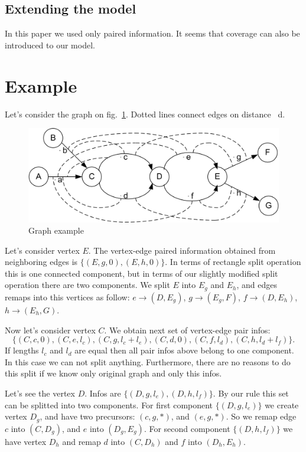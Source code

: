 \documentclass[12pt,a4paper,oneside]{article}
\begin{document}
\subsection{Extending the model}
  In this paper we used only paired information. It seems that coverage can also be introduced to our model.
\section{Example}
Let's consider the graph on fig.~\ref{fig1}. Dotted lines connect edges on
distance ~d.
\begin{figure}
\begin{center}\includegraphics{jpg/Paired_Example.jpg}\end{center}
\caption{Graph example}
\label{fig1}
\end{figure}
Let's consider vertex $E$. The vertex-edge paired information obtained
from neighboring edges is $\{(E,g, 0),(E,h,0)\}$. In terms of rectangle
split operation this is one connected component, but in terms of our
slightly modified split operation there are two components. We split $E$
into $E_g$ and $E_h$, and edges remaps into this vertices as follow:
$e \rightarrow (D, E_g)$, $g \rightarrow (E_g,F)$, $f \rightarrow (D,E_h)$, $h \rightarrow (E_h, G)$.

Now let's consider vertex $C$. We obtain next set of vertex-edge pair
infos: $$\{(C,c,0), (C,e,l_c), (C,g,l_c+l_e), (C,d,0), (C,f,l_d),
(C,h,l_d+l_f)\}.$$ If lengths $l_c$ and $l_d$ are equal then all pair infos
above belong to one component. In this case we can not split anything.
Furthermore, there are no reasons to do this split if we know only
original graph and only this infos.

Let's see the vertex $D$. Infos are $\{(D,g,l_e),(D,h,l_f)\}$. By our rule
this set can be splitted into two components. For first component
$\{(D,g,l_e)\}$ we create vertex $D_g$, and have two precursors: $(c,g,*)$,
and $(e,g,*)$. So we remap edge $c$ into $(C, D_g)$, and $e$ into $(D_g, E_g)$.
For second component $\{(D,h,l_f)\}$ we have vertex $D_h$ and remap $d$ into
$(C,D_h)$ and $f$ into $(D_h,E_h)$.
\end{document}
